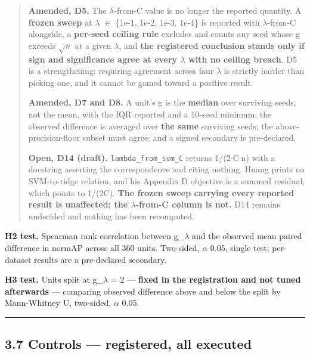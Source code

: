 \documentclass[
  10pt,
]{article}
\begin{document}
\begin{quote}
\textbf{Amended, D5.} The \(\lambda\)-from-C value is no longer the
reported quantity. A \textbf{frozen sweep} at \(\lambda\) \(\in\)
\{1e-1, 1e-2, 1e-3, 1e-4\} is reported with \(\lambda\)-from-C
alongside, a \textbf{per-seed ceiling rule} excludes and counts any seed
whose g exceeds \(\sqrt{n}\) at a given \(\lambda\), and \textbf{the
registered conclusion stands only if sign and significance agree at
every \(\lambda\) with no ceiling breach}. D5 is a strengthening:
requiring agreement across four \(\lambda\) is strictly harder than
picking one, and it cannot be gamed toward a positive result.

\textbf{Amended, D7 and D8.} A unit's g is the \textbf{median} over
surviving seeds, not the mean, with the IQR reported and a 10-seed
minimum; the observed difference is averaged over \textbf{the same}
surviving seeds; the above-precision-floor subset must agree; and a
signed secondary is pre-declared.

\textbf{Open, D14 (draft).} \texttt{lambda\_\allowbreak{}from\_\allowbreak{}svm\_\allowbreak{}C} returns
1/(2\(\cdot\)C\(\cdot\)n) with a docstring asserting the correspondence
and citing nothing. Huang prints no SVM-to-ridge relation, and his
Appendix D objective is a summed residual, which points to 1/(2C).
\textbf{The frozen sweep carrying every reported result is unaffected;
the \(\lambda\)-from-C column is not.} D14 remains undecided and nothing
has been recomputed.
\end{quote}

\textbf{H2 test.} Spearman rank correlation between g\_\(\lambda\) and
the observed mean paired difference in normAP across all 360 units.
Two-sided, \(\alpha\) 0.05, single test; per-dataset results are a
pre-declared secondary.

\textbf{H3 test.} Units split at g\_\(\lambda\) = 2 --- \textbf{fixed in
the registration and not tuned afterwards} --- comparing
\textbar observed difference\textbar{} above and below the split by
Mann-Whitney U, two-sided, \(\alpha\) 0.05.

\begin{center}\rule{0.5\linewidth}{0.5pt}\end{center}

\subsection{3.7 Controls --- registered, all
executed}\label{controls-registered-all-executed}
\end{document}
